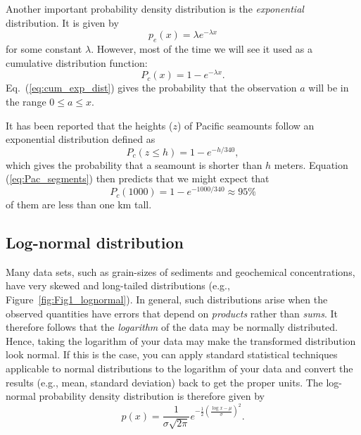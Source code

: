 	Another important probability density distribution is the \emph{exponential} distribution.  It is given by
\begin{equation}
p_e(x) = \lambda e ^{-\lambda x}
\end{equation}
for some constant $\lambda$.  However, most of the time we will see it used as a cumulative distribution function:
\begin{equation}P_c(x) = 1-e^{-\lambda x}.
\label{eq:cum_exp_dist}
\end{equation}
Eq.\ (\ref{eq:cum_exp_dist}) gives the probability that the observation $a$ will be in the range $0 \leq a \leq x$.
\begin{example}
It has been reported that the heights ($z$) of Pacific seamounts follow an 
exponential distribution defined as 
\begin{equation}
P_c(z \leq h) = 1 - e^{-h/340},
\label{eq:Pac_segments}
\end{equation}
which gives the probability that a seamount is shorter than $h$ meters.  Equation 
(\ref{eq:Pac_segments}) then predicts that we might expect that 
\begin{equation}
P_c(1000) = 1 - e^{-1000/340} \approx 95\%
\end{equation}
of them are less than one km tall.
\end{example}

\subsection{Log-normal distribution}

	Many data sets, such as grain-sizes of sediments and geochemical concentrations, have very 
skewed and long-tailed distributions (e.g., Figure~\ref{fig:Fig1_lognormal}).  In general, such distributions arise when the observed 
quantities have errors that depend on \emph{products} rather than \emph{sums}.  It therefore follows that the \emph{logarithm} of the 
data may be normally distributed.  Hence, taking the logarithm of your data may make the 
transformed distribution look normal.  If this is the case, you can apply standard statistical 
techniques applicable to normal distributions to the logarithm of your data and convert the results 
(e.g., mean, standard deviation) back to get the proper units.  The log-normal probability density distribution is therefore given by
\begin{equation}
	p(x) = \frac{1}{\sigma \sqrt{2 \pi}} e^{- \frac{1}{2} \left( \frac{\log x-\mu}{\sigma} \right) ^2 }.
	\label{eq:lognorm}
\end{equation}

